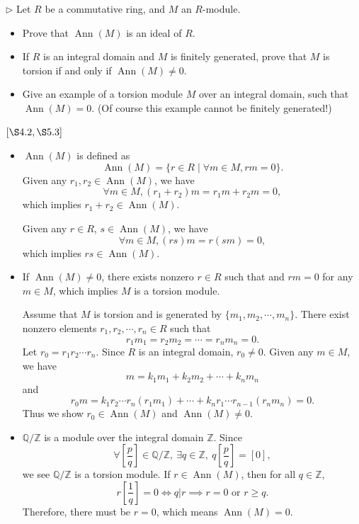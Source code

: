 \documentclass[12pt,letterpaper,boxed]{hmcpset}
\begin{document}
\begin{problem}[4.4]
$\triangleright$ Let $R$ be a commutative ring, and $M$ an $R$-module.
\begin{itemize}
	\item Prove that $\operatorname{Ann}(M)$ is an ideal of $R$.
	\item If $R$ is an integral domain and $M$ is finitely generated, prove that $M$ is torsion if and only if $\operatorname{Ann}(M) \neq 0$.
	\item Give an example of a torsion module $M$ over an integral domain, such that $\operatorname{Ann}(M)=0 .$ (Of course this example cannot be finitely generated!)
\end{itemize}
$[\S 4.2, \S 5.3]$
\end{problem}
\begin{solution}
\begin{itemize}
	\item $\operatorname{Ann}(M)$ is defined as
	\[
	\operatorname{Ann}(M)=\{r \in R \mid \forall m \in M, r m=0\}.
	\]
	Given any $r_1,r_2\in\operatorname{Ann}(M)$, we have 
	\[
	\forall m\in M, (r_1+r_2)m=r_1m+r_2m=0,
	\]
	which implies $r_1+r_2\in\operatorname{Ann}(M)$.
	
	Given any $r\in R$, $s\in\operatorname{Ann}(M)$, we have
	\[
	\forall m\in M, (rs)m=r(sm)=0,
	\]
	which implies $rs\in\operatorname{Ann}(M)$.
	\item If $\operatorname{Ann}(M) \neq 0$, there exists nonzero $r\in R$ such that and $rm=0$ for any $m\in M$, which implies $M$ is a torsion module.
	
	Assume that $M$ is torsion and is generated by $\{m_1,m_2,\cdots,m_n\}$. There exist nonzero elements $r_1,r_2,\cdots,r_n\in R$ such that
	\[
	r_1m_1=r_2m_2=\cdots=r_nm_n=0.
	\]
	Let $r_0=r_1r_2\cdots r_n$. Since $R$ is an integral domain, $r_0\ne0$. Given any $m\in M$, we have
	\[
	m=k_1m_1+k_2m_2+\cdots+k_nm_n
	\]
	and
	\[
	r_0m=k_1r_2\cdots r_n(r_1m_1)+\cdots+k_nr_1\cdots r_{n-1} (r_nm_n)=0.
	\]
	Thus we show $r_0\in\operatorname{Ann}(M)$ and $\operatorname{Ann}(M)\ne0$.
	\item $\mathbb{Q}/\mathbb{Z}$ is a module over the integral domain $\mathbb{Z}$. Since
	\[
	\forall \left[\frac{p}{q}\right]\in \mathbb{Q}/\mathbb{Z},\ \exists q\in\mathbb{Z},\ q\left[\frac{p}{q}\right]=[0],
	\]
	we see $\mathbb{Q}/\mathbb{Z}$ is a torsion module. If $r\in\operatorname{Ann}(M)$, then for all $q\in\mathbb{Z}$,
	\[
	r\left[\frac{1}{q}\right]=0\iff q|r\implies r=0\text{ or } r\ge q.
	\]
	Therefore, there must be $r=0$, which means $\operatorname{Ann}(M)=0$.
	
\end{itemize}
\end{solution}
\end{document}
